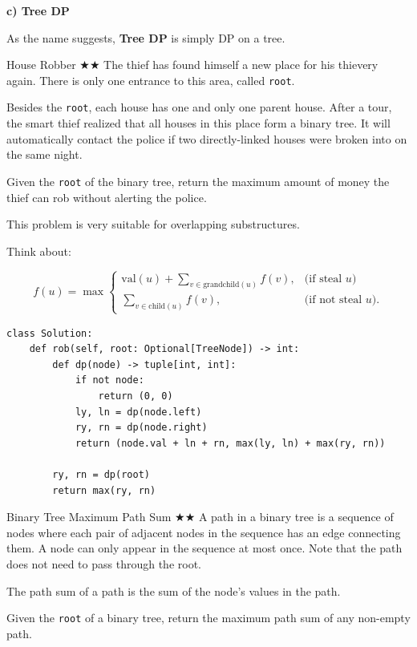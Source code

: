 \documentclass{article}
\begin{document}
\textbf{c) Tree DP}

As the name suggests, \textbf{Tree DP} is simply DP on a tree.

\begin{Question}{House Robber
 $\bigstar$$\bigstar$}
The thief has found himself a new place for his thievery again. There is only one entrance to this area, called \texttt{root}.

Besides the \texttt{root}, each house has one and only one parent house. After a tour, the smart thief realized that all houses in this place form a binary tree. It will automatically contact the police if two directly-linked houses were broken into on the same night.

Given the \texttt{root} of the binary tree, return the maximum amount of money the thief can rob without alerting the police.
\end{Question}

This problem is very suitable for overlapping substructures.

\newpage

Think about:

$$f(u) = \max \begin{cases} \text{val}(u) + \displaystyle\sum_{v \in \text{grandchild}(u)} f(v), & \text{(if steal } u) \\ \displaystyle\sum_{v \in \text{child}(u)} f(v), & \text{(if not steal } u). \end{cases}$$

\begin{lstlisting}[style=python]
class Solution:
    def rob(self, root: Optional[TreeNode]) -> int:
        def dp(node) -> tuple[int, int]:
            if not node:
                return (0, 0)
            ly, ln = dp(node.left)
            ry, rn = dp(node.right)
            return (node.val + ln + rn, max(ly, ln) + max(ry, rn))
            
        ry, rn = dp(root)
        return max(ry, rn)
\end{lstlisting}




\begin{Question}{Binary Tree Maximum Path Sum
 $\bigstar$$\bigstar$}
A path in a binary tree is a sequence of nodes where each pair of adjacent nodes in the sequence has an edge connecting them. A node can only appear in the sequence at most once. Note that the path does not need to pass through the root.

The path sum of a path is the sum of the node's values in the path.

Given the \texttt{root} of a binary tree, return the maximum path sum of any non-empty path.
\end{Question}
\end{document}
